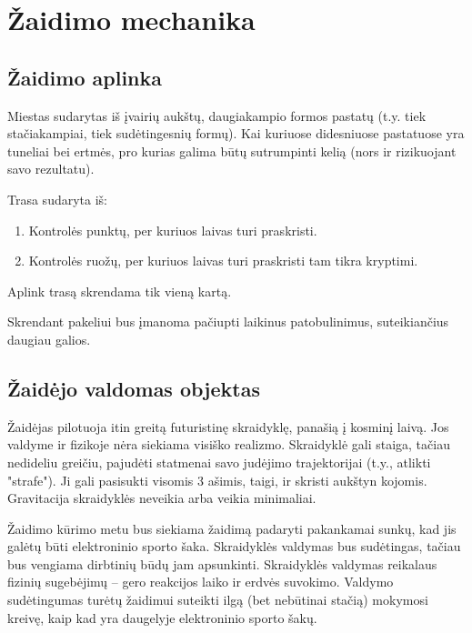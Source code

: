 \section{Žaidimo mechanika}
\subsection{Žaidimo aplinka}

Miestas sudarytas iš įvairių aukštų, daugiakampio formos pastatų (t.y. tiek stačiakampiai, tiek sudėtingesnių formų).
Kai kuriuose didesniuose pastatuose yra tuneliai bei ertmės, pro kurias galima būtų sutrumpinti kelią (nors ir rizikuojant savo rezultatu).

Trasa sudaryta iš:
\begin{enumerate}
\item Kontrolės punktų, per kuriuos laivas turi praskristi.
\item Kontrolės ruožų, per kuriuos laivas turi praskristi tam tikra kryptimi.
\end{enumerate}
Aplink trasą skrendama tik vieną kartą.

Skrendant pakeliui bus įmanoma pačiupti laikinus patobulinimus, suteikiančius daugiau galios.

\subsection{Žaidėjo valdomas objektas}

Žaidėjas pilotuoja itin greitą futuristinę skraidyklę, panašią į kosminį laivą.
Jos valdyme ir fizikoje nėra siekiama visiško realizmo.
Skraidyklė gali staiga, tačiau nedideliu greičiu, pajudėti statmenai savo judėjimo trajektorijai (t.y., atlikti "strafe").
Ji gali pasisukti visomis 3 ašimis, taigi, ir skristi aukštyn kojomis.
Gravitacija skraidyklės neveikia arba veikia minimaliai.

Žaidimo kūrimo metu bus siekiama žaidimą padaryti pakankamai sunkų, kad jis galėtų būti elektroninio sporto šaka.
Skraidyklės valdymas bus sudėtingas, tačiau bus vengiama dirbtinių būdų jam apsunkinti.
Skraidyklės valdymas reikalaus fizinių sugebėjimų -- gero reakcijos laiko ir erdvės suvokimo.
Valdymo sudėtingumas turėtų žaidimui suteikti ilgą (bet nebūtinai stačią) mokymosi kreivę, kaip kad yra daugelyje elektroninio sporto šakų.
